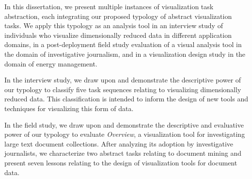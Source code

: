In this dissertation, we present multiple instances of visualization task abstraction, each integrating our proposed typology of abstract visualization tasks.
We apply this typology as an analysis tool in an interview study of individuals who visualize dimensionally reduced data in different application domains, in a post-deployment field study evaluation of a visual analysis tool in the domain of investigative journalism, and in a visualization design study in the domain of energy management.

In the interview study, we draw upon and demonstrate the descriptive power of our typology to classify five task sequences relating to visualizing dimensionally reduced data. 
This classification is intended to inform the design of new tools and techniques for visualizing this form of data.

In the field study, we draw upon and demonstrate the descriptive and evaluative power of our typology to evaluate {\it Overview}, a visualization tool for investigating large text document collections. 
After analyzing its adoption by investigative journalists, we characterize two abstract tasks relating to document mining and present seven lessons relating to the design of visualization tools for document data.

